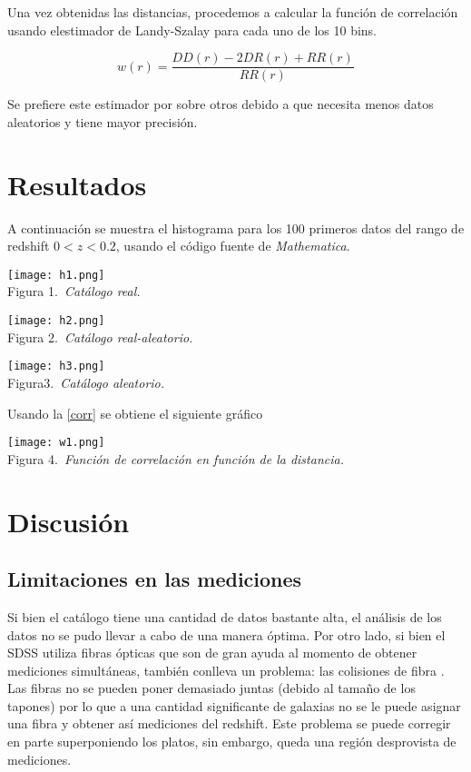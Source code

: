 \documentclass[twocolumn,letterpaper,spanish]{revtex4}
\numberwithin{equation}{section}
\begin{document}
Una vez obtenidas las distancias, procedemos a calcular la funci\'on de correlaci\'on usando elestimador de Landy-Szalay \cite{landy} para cada uno de los 10 bins.

\begin{equation}\label{corr}
w(r)=\frac{DD(r)-2DR(r)+RR(r)}{RR(r)}
\end{equation}

Se prefiere este estimador por sobre otros debido a que necesita menos datos aleatorios y tiene mayor precisi\'on.

\section{Resultados}

A continuaci\'on se muestra el histograma para los 100 primeros datos del rango de redshift $0 < z < 0.2$, usando el c\'odigo fuente de \textit{Mathematica}.

  \begin{center}
   \texttt{[image: h1.png]}\\
   Figura 1.\emph{\ Cat\'alogo real.}
  \end{center}
  
   \begin{center}
   \texttt{[image: h2.png]}\\
   Figura 2.\emph{\ Cat\'alogo real-aleatorio.}
  \end{center}
  
   \begin{center}
   \texttt{[image: h3.png]}\\
   Figura3.\emph{\ Cat\'alogo aleatorio.}
  \end{center}
  
  
 Usando la \eqref{corr} se obtiene el siguiente gr\'afico
 
  \begin{center}
   \texttt{[image: w1.png]}\\
   Figura 4.\emph{\ Funci\'on de correlaci\'on en funci\'on de la distancia.}
  \end{center}

\section{Discusi\'on}

\subsection{Limitaciones en las mediciones}
Si bien el cat\'alogo tiene una cantidad de datos bastante alta, el an\'alisis de los datos no se pudo llevar a cabo de una manera \'optima. Por otro lado, si bien el SDSS utiliza fibras \'opticas que son de gran ayuda al momento de obtener mediciones simult\'aneas, tambi\'en conlleva un problema: las colisiones de fibra \cite{strauss}. Las fibras no se pueden poner demasiado juntas (debido al tamaño de los tapones) por lo que a una cantidad significante de galaxias no se le puede asignar una fibra y obtener as\'i mediciones del redshift. Este problema se puede corregir en parte superponiendo los platos, sin embargo, queda una regi\'on desprovista de mediciones.
\end{document}
